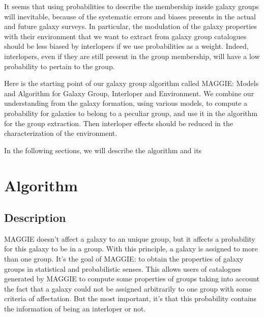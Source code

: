 It seems that using probabilities to describe the membership inside galaxy
groups will inevitable, because of the systematic errors and biases presents
in the actual and future galaxy surveys. In particular, the modulation of
the galaxy properties with their environment that we want to extract from
galaxy group catalogues should be less biased by interlopers if we use
probabilities as a weight. Indeed, interlopers, even if they are still
present in the group membership, will have a low probability to pertain to
the group.

Here is the starting point of our galaxy group algorithm called MAGGIE\@:
Models and Algorithm for Galaxy Group, Interloper and Environment. We
combine our understanding from the galaxy formation, using various models,
to compute a probability for galaxies to belong to a peculiar group, and use
it in the algorithm for the group extraction. Then interloper effects should
be reduced in the characterization of the environment.

In the following sections, we will describe the algorithm and its

\section{Algorithm}
\label{sec:algorithm}

\subsection{Description}
\label{sub:maggie_description}

MAGGIE doesn't affect a galaxy to an
unique group, but it affects a probability for this galaxy to be in a group.
With this principle, a galaxy is assigned to more than one group. It's the
goal of MAGGIE\@: to obtain the properties of galaxy groups in statistical
and probabilistic senses. This allows users of catalogues generated by
MAGGIE to compute some properties of groups taking into account the fact
that a galaxy could not be assigned arbitrarily to one group with some
criteria of affectation. But the most important, it's that this probability
contains the information of being an interloper or not.

